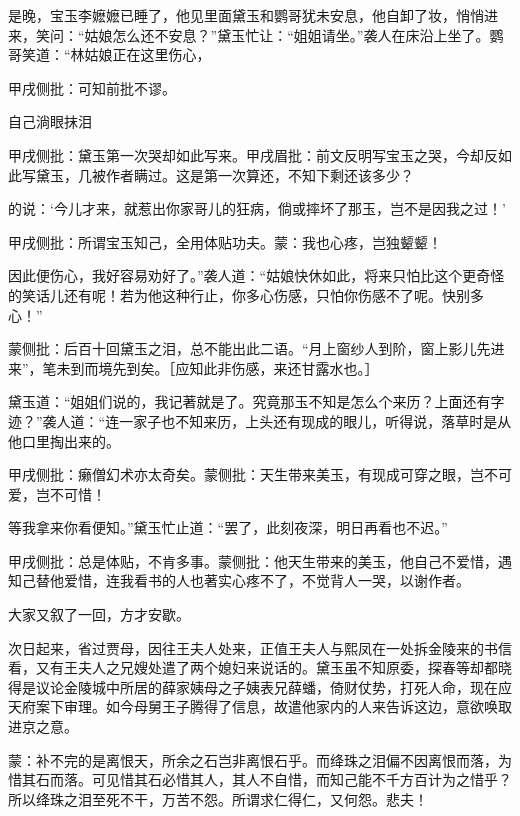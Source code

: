 \begin{parag}
    是晚，宝玉李嬷嬷已睡了，他见里面黛玉和鹦哥犹未安息，他自卸了妆，悄悄进来，笑问：“姑娘怎么还不安息？”黛玉忙让：“姐姐请坐。”袭人在床沿上坐了。鹦哥笑道：“林姑娘正在这里伤心，\begin{note}甲戌侧批：可知前批不谬。\end{note}自己淌眼抹泪\begin{note}甲戌侧批：黛玉第一次哭却如此写来。甲戌眉批：前文反明写宝玉之哭，今却反如此写黛玉，几被作者瞒过。这是第一次算还，不知下剩还该多少？\end{note}的说：‘今儿才来，就惹出你家哥儿的狂病，倘或摔坏了那玉，岂不是因我之过！’\begin{note}甲戌侧批：所谓宝玉知己，全用体贴功夫。蒙：我也心疼，岂独颦颦！\end{note}因此便伤心，我好容易劝好了。”袭人道：“姑娘快休如此，将来只怕比这个更奇怪的笑话儿还有呢！若为他这种行止，你多心伤感，只怕你伤感不了呢。快别多心！”\begin{note}蒙侧批：后百十回黛玉之泪，总不能出此二语。“月上窗纱人到阶，窗上影儿先进来”，笔未到而境先到矣。［应知此非伤感，来还甘露水也。］\end{note}黛玉道：“姐姐们说的，我记著就是了。究竟那玉不知是怎么个来历？上面还有字迹？”袭人道：“连一家子也不知来历，上头还有现成的眼儿，听得说，落草时是从他口里掏出来的。\begin{note}甲戌侧批：癞僧幻术亦太奇矣。蒙侧批：天生带来美玉，有现成可穿之眼，岂不可爱，岂不可惜！\end{note}等我拿来你看便知。”黛玉忙止道：“罢了，此刻夜深，明日再看也不迟。”\begin{note}甲戌侧批：总是体贴，不肯多事。蒙侧批：他天生带来的美玉，他自己不爱惜，遇知己替他爱惜，连我看书的人也著实心疼不了，不觉背人一哭，以谢作者。\end{note}大家又叙了一回，方才安歇。
\end{parag}


\begin{parag}
    次日起来，省过贾母，因往王夫人处来，正值王夫人与熙凤在一处拆金陵来的书信看，又有王夫人之兄嫂处遣了两个媳妇来说话的。黛玉虽不知原委，探春等却都晓得是议论金陵城中所居的薛家姨母之子姨表兄薛蟠，倚财仗势，打死人命，现在应天府案下审理。如今母舅王子腾得了信息，故遣他家内的人来告诉这边，意欲唤取进京之意。
\end{parag}


\begin{parag}
    \begin{note}蒙：补不完的是离恨天，所余之石岂非离恨石乎。而绛珠之泪偏不因离恨而落，为惜其石而落。可见惜其石必惜其人，其人不自惜，而知己能不千方百计为之惜乎？所以绛珠之泪至死不干，万苦不怨。所谓求仁得仁，又何怨。悲夫！\end{note}
\end{parag}